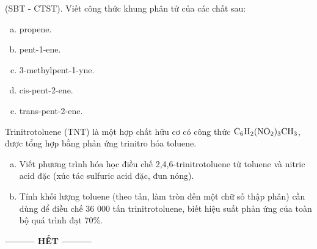 \documentclass[12pt,a4paper]{article}
\begin{document}
\begin{ex}
(SBT - CTST). Viết công thức khung phân tử của các chất sau:
\begin{enumerate}[a)]
    \setlength\itemsep{0pt}
    \item propene.
    \item pent-1-ene.
    \item 3-methylpent-1-yne.
    \item cis-pent-2-ene.
    \item trans-pent-2-ene.
\end{enumerate}

\vspace{5.0cm}

\end{ex}

\begin{ex}
Trinitrotoluene (TNT) là một hợp chất hữu cơ có công thức $\ce{C6H2(NO2)3CH3}$, được tổng hợp bằng phản ứng trinitro hóa toluene.
\begin{enumerate}[a)]
    \setlength\itemsep{0pt}
    \item Viết phương trình hóa học điều chế 2,4,6-trinitrotoluene từ toluene và nitric acid đặc (xúc tác sulfuric acid đặc, đun nóng).
    \item Tính khối lượng toluene (theo tấn, làm tròn đến một chữ số thập phân) cần dùng để điều chế 36 000 tấn trinitrotoluene, biết hiệu suất phản ứng của toàn bộ quá trình đạt 70\%.
\end{enumerate}

\vspace{5.0cm}

\end{ex}

\begin{center}
\textbf{--------- HẾT ---------}
\end{center}
\end{document}
